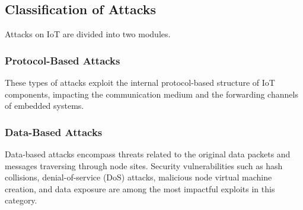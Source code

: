 \documentclass[conference,compsoc]{IEEEtran}
\begin{document}
\subsection{Classification of Attacks}
Attacks on IoT are divided into two modules.
\subsubsection{Protocol-Based Attacks} 
These types of attacks exploit the internal protocol-based structure of IoT components, impacting the communication medium and the forwarding channels of embedded systems.
\subsubsection{Data-Based Attacks} 
Data-based attacks encompass threats related to the original data packets and messages traversing through node sites. Security vulnerabilities such as hash collisions, denial-of-service (DoS) attacks, malicious node virtual machine creation, and data exposure are among the most impactful exploits in this category.
\end{document}
